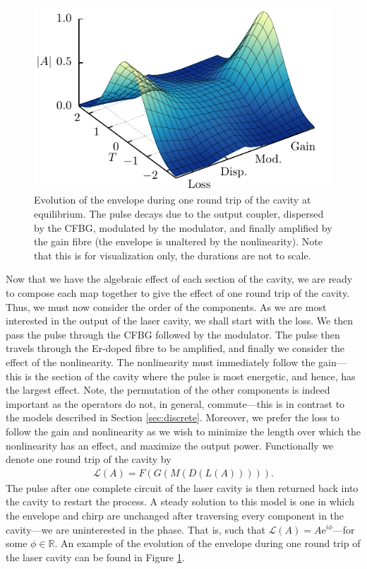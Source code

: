 \documentclass[10pt,twocolumn,a4paper]{article}
\begin{document}
\begin{figure}[tbp]
	\centering
	\includegraphics{Evo}
	\caption{Evolution of the envelope during one round trip of the cavity at equilibrium. The pulse decays due to the output coupler, dispersed by the CFBG, modulated by the modulator, and finally amplified by the gain fibre (the envelope is unaltered by the nonlinearity). Note that this is for visualization only, the durations are not to scale.}
	\label{fig:cavityevo}
\end{figure}

Now that we have the algebraic effect of each section of the cavity, we are ready to compose each map together to give the effect of one round trip of the cavity. Thus, we must now consider the order of the components. As we are most interested in the output of the laser cavity, we shall start with the loss. We then pass the pulse through the CFBG followed by the modulator. The pulse then travels through the Er-doped fibre to be amplified, and finally we consider the effect of the nonlinearity. The nonlinearity must immediately follow the gain---this is the section of the cavity where the pulse is most energetic, and hence, has the largest effect. Note, the permutation of the other components is indeed important as the operators do not, in general, commute---this is in contrast to the models described in Section \ref{sec:discrete}. Moreover, we prefer the loss to follow the gain and nonlinearity as we wish to minimize the length over which the nonlinearity has an effect, and maximize the output power. Functionally we denote one round trip of the cavity by
\begin{align}
	\mathcal{L}(A) = F(G(M(D(L(A))))).
	\label{eq:order}
\end{align}
 The pulse after one complete circuit of the laser cavity is then returned back into the cavity to restart the process. A steady solution to this model is one in which the envelope and chirp are unchanged after traversing every component in the cavity---we are uninterested in the phase. That is, such that $\mathcal{L}(A) = A \textrm{e}^{i \phi}$---for some $\phi \in \mathbb{R}$. An example of the evolution of the envelope during one round trip of the laser cavity can be found in Figure \ref{fig:cavityevo}.
\end{document}
